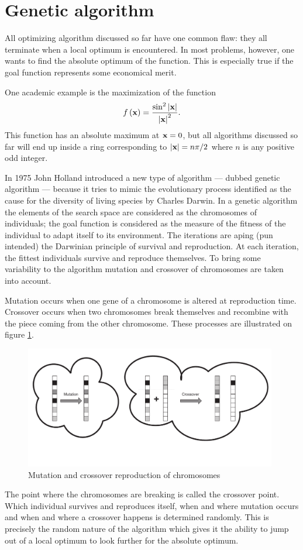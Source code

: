 \section{Genetic algorithm}
All optimizing algorithm discussed so far have one common flaw:
they all terminate when a local optimum is encountered. In most
problems, however, one wants to find the absolute optimum of the
function. This is especially true if the goal function represents
some economical merit.

\noindent One academic example is the maximization of the function
\begin{equation}
\label{eq:geneticCase}
  f\left({\textbf x}\right)={ \sin^2\left|{\textbf x}\right| \over\left|{\textbf
  x}\right|^2}.
\end{equation}
This function has an absolute maximum at ${\textbf x}=0$, but all
algorithms discussed so far will end up inside a ring
corresponding to $\left|{\textbf x}\right|=n\pi/2$ where $n$ is any
positive odd integer.

In 1975 John Holland introduced a new type of algorithm --- dubbed
genetic algorithm --- because it tries to mimic the evolutionary
process identified as the cause for the diversity of living
species by Charles Darwin. In a genetic algorithm the elements of
the search space are considered as the chromosomes of individuals;
the goal function is considered as the measure of the fitness of
the individual to adapt itself to its
environment\cite{BerLin}\cite{Koza}. The iterations are aping (pun
intended) the Darwinian principle of survival and reproduction. At
each iteration, the fittest individuals survive and reproduce
themselves. To bring some variability to the algorithm mutation
and crossover of chromosomes are taken into account.

Mutation occurs when one gene of a chromosome is altered at
reproduction time. Crossover occurs when two chromosomes break
themselves and recombine with the piece coming from the other
chromosome. These processes are illustrated on figure
\ref{fig:crossover}.
\begin{figure}
\centering\includegraphics[width=11cm]{Figures/Crossover}
\caption{Mutation and crossover reproduction of
chromosomes}\label{fig:crossover}
\end{figure}
The point where the chromosomes are breaking is called the
crossover point. Which individual survives and reproduces itself,
when and where mutation occurs and when and where a crossover
happens is determined randomly. This is precisely the random
nature of the algorithm which gives it the ability to jump out of
a local optimum to look further for the absolute optimum.

